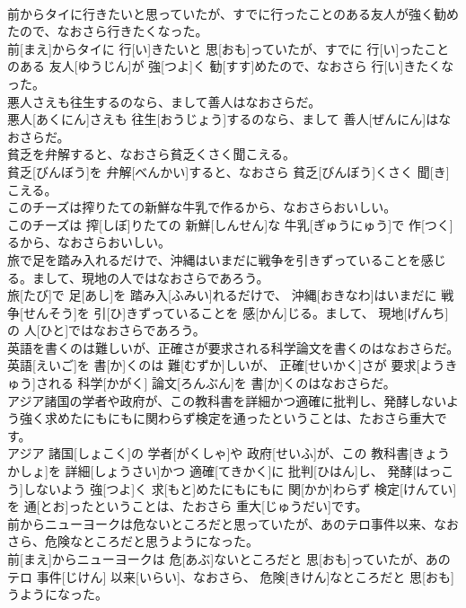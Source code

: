 \documentclass[8pt]{extreport}
\begin{document}
\begin{CJK}{UTF8}{min}
\\	前からタイに行きたいと思っていたが、すでに行ったことのある友人が強く勧めたので、なおさら行きたくなった。	
\\	前[まえ]からタイに 行[い]きたいと 思[おも]っていたが、すでに 行[い]ったことのある 友人[ゆうじん]が 強[つよ]く 勧[すす]めたので、なおさら 行[い]きたくなった。
\\	悪人さえも往生するのなら、まして善人はなおさらだ。	
\\	悪人[あくにん]さえも 往生[おうじょう]するのなら、まして 善人[ぜんにん]はなおさらだ。
\\	貧乏を弁解すると、なおさら貧乏くさく聞こえる。	
\\	貧乏[びんぼう]を 弁解[べんかい]すると、なおさら 貧乏[びんぼう]くさく 聞[き]こえる。
\\	このチーズは搾りたての新鮮な牛乳で作るから、なおさらおいしい。	
\\	このチーズは 搾[しぼ]りたての 新鮮[しんせん]な 牛乳[ぎゅうにゅう]で 作[つく]るから、なおさらおいしい。
\\	旅で足を踏み入れるだけで、沖縄はいまだに戦争を引きずっていることを感じる。まして、現地の人ではなおさらであろう。	
\\	旅[たび]で 足[あし]を 踏み入[ふみい]れるだけで、 沖縄[おきなわ]はいまだに 戦争[せんそう]を 引[ひ]きずっていることを 感[かん]じる。まして、 現地[げんち]の 人[ひと]ではなおさらであろう。
\\	英語を書くのは難しいが、正確さが要求される科学論文を書くのはなおさらだ。	
\\	英語[えいご]を 書[か]くのは 難[むずか]しいが、 正確[せいかく]さが 要求[ようきゅう]される 科学[かがく] 論文[ろんぶん]を 書[か]くのはなおさらだ。
\\	アジア諸国の学者や政府が、この教科書を詳細かつ適確に批判し、発酵しないよう強く求めたにもにもに関わらず検定を通ったということは、たおさら重大です。	
\\	アジア 諸国[しょこく]の 学者[がくしゃ]や 政府[せいふ]が、この 教科書[きょうかしょ]を 詳細[しょうさい]かつ 適確[てきかく]に 批判[ひはん]し、 発酵[はっこう]しないよう 強[つよ]く 求[もと]めたにもにもに 関[かか]わらず 検定[けんてい]を 通[とお]ったということは、たおさら 重大[じゅうだい]です。
\\	前からニューヨークは危ないところだと思っていたが、あのテロ事件以来、なおさら、危険なところだと思うようになった。	
\\	前[まえ]からニューヨークは 危[あぶ]ないところだと 思[おも]っていたが、あのテロ 事件[じけん] 以来[いらい]、なおさら、 危険[きけん]なところだと 思[おも]うようになった。

\end{CJK}
\end{document}
